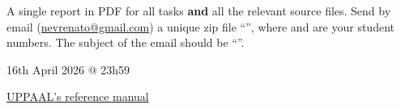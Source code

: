 \documentclass[11pt]{article}
\theoremstyle{myplain}
\theoremstyle{definition} %
\begin{document}
\bigskip

\begin{mdframed}  
   A single report in PDF for all tasks 
  \textbf{and} all the relevant source files. 
  Send by email
  (\underline{nevrenato@gmail.com}) a unique zip file
  ``'', where  and  are your
  student numbers. The subject of the email should be ``''.

 16th April 2026 @ 23h59
\end{mdframed}

\bigskip
\begin{center}
        \href{https://docs.uppaal.org/}{\textsc{UPPAAL}'s reference manual} 
\end{center}
\end{document}
